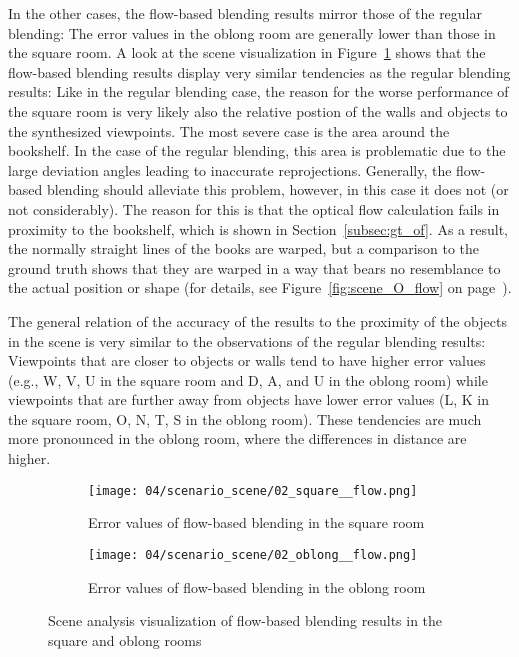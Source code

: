 In the other cases, the flow-based blending results mirror those of the regular blending: The error values in the oblong room are generally lower than those in the square room. A look at the scene visualization in Figure~\ref{fig:scene_flow_square_oblong} shows that the flow-based blending results display very similar tendencies as the regular blending results:
Like in the regular blending case, the reason for the worse performance of the square room is very likely also the relative postion of the walls and objects to the synthesized viewpoints.
The most severe case is the area around the bookshelf. In the case of the regular blending, this area is problematic due to the large deviation angles leading to inaccurate reprojections. Generally, the flow-based blending should alleviate this problem, however, in this case it does not (or not considerably).
The reason for this is that
the optical flow calculation fails in proximity to the bookshelf, which is shown in Section~\ref{subsec:gt_of}. As a result, the normally straight lines of the books are warped, but a comparison to the ground truth shows that they are warped in a way that bears no resemblance to the actual position or shape (for details, see Figure~\ref{fig:scene_O_flow} on page~\pageref{fig:scene_O_flow}). 

The general relation of the accuracy of the results to the proximity of the objects in the scene is very similar to the observations of the regular blending results: Viewpoints that are closer to objects or walls tend to have higher error values (e.g., W, V, U in the square room and D, A, and U in the oblong room) while viewpoints that are further away from objects have lower error values (L, K in the square room, O, N, T, S in the oblong room). These tendencies are much more pronounced in the oblong room, where the differences in distance are higher.

\begin{figure}
\centering
    \hfill
    \begin{subfigure}[b]{0.4\textwidth}
            \centering
            \texttt{[image: 04/scenario\_scene/02\_square\_\_flow.png]}
            \caption{Error values of flow-based blending in the square room}
    \end{subfigure}
    \hfill
    \begin{subfigure}[b]{0.4\textwidth}
            \centering
            \texttt{[image: 04/scenario\_scene/02\_oblong\_\_flow.png]}
            \caption{Error values of flow-based blending in the oblong room}
    \end{subfigure}
    \hfill
  \caption{Scene analysis visualization of flow-based blending results in the square and oblong rooms} \label{fig:scene_flow_square_oblong}
\end{figure}




